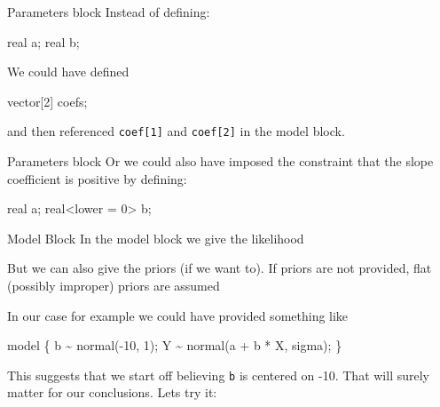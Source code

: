 \documentclass[
  11pt,
  ignorenonframetext,
]{beamer}
\newenvironment{Shaded}{\begin{snugshade}}{\end{snugshade}}
\newcommand{\DecValTok}[1]{\textcolor[rgb]{0.68,0.00,0.00}{#1}}
\newcommand{\FunctionTok}[1]{\textcolor[rgb]{0.28,0.35,0.67}{#1}}
\newcommand{\NormalTok}[1]{\textcolor[rgb]{0.00,0.23,0.31}{#1}}
\newcommand{\OtherTok}[1]{\textcolor[rgb]{0.00,0.23,0.31}{#1}}
\newcommand{\SpecialCharTok}[1]{\textcolor[rgb]{0.37,0.37,0.37}{#1}}
\begin{document}
\begin{frame}[fragile]{Parameters block}
\protect\hypertarget{parameters-block-1}{}
Instead of defining:

\begin{Shaded}
\begin{Highlighting}[]
\NormalTok{real a;}
\NormalTok{real b;}
\end{Highlighting}
\end{Shaded}

We could have defined

\begin{Shaded}
\begin{Highlighting}[]
\NormalTok{vector[}\DecValTok{2}\NormalTok{] coefs;}
\end{Highlighting}
\end{Shaded}

and then referenced \texttt{coef{[}1{]}} and \texttt{coef{[}2{]}} in the
model block.
\end{frame}

\begin{frame}[fragile]{Parameters block}
\protect\hypertarget{parameters-block-2}{}
Or we could also have imposed the constraint that the slope coefficient
is positive by defining:

\begin{Shaded}
\begin{Highlighting}[]
\NormalTok{real a;}
\NormalTok{real}\SpecialCharTok{\textless{}}\NormalTok{lower }\OtherTok{=} \DecValTok{0}\SpecialCharTok{\textgreater{}}\NormalTok{ b;}
\end{Highlighting}
\end{Shaded}
\end{frame}

\begin{frame}[fragile]{Model Block}
\protect\hypertarget{model-block}{}
In the model block we give the likelihood

But we can also give the priors (if we want to). If priors are not
provided, flat (possibly improper) priors are assumed

In our case for example we could have provided something like

\begin{Shaded}
\begin{Highlighting}[]
\NormalTok{model \{}
\NormalTok{  b }\SpecialCharTok{\textasciitilde{}} \FunctionTok{normal}\NormalTok{(}\SpecialCharTok{{-}}\DecValTok{10}\NormalTok{, }\DecValTok{1}\NormalTok{);}
\NormalTok{  Y }\SpecialCharTok{\textasciitilde{}} \FunctionTok{normal}\NormalTok{(a }\SpecialCharTok{+}\NormalTok{ b }\SpecialCharTok{*}\NormalTok{ X, sigma);}
\NormalTok{\}}
\end{Highlighting}
\end{Shaded}

This suggests that we start off believing \texttt{b} is centered on -10.
That will surely matter for our conclusions. Lets try it:
\end{frame}
\end{document}
